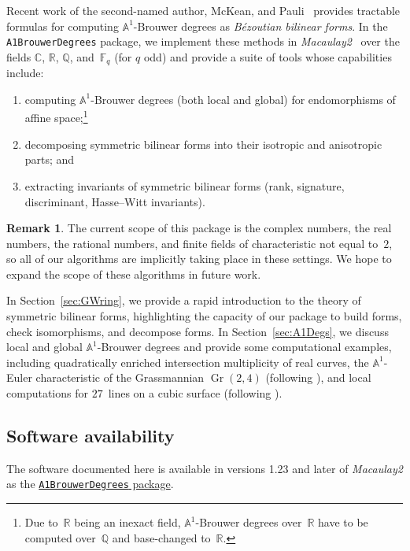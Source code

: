 \documentclass[12pt]{amsart}
\theoremstyle{definition}
\newtheorem{remark}[theorem]{Remark}
\providecommand{\A}{\mathbb{A}}
\DeclareMathOperator{\Gr}{Gr}
\begin{document}
Recent work of the second-named author, McKean, and Pauli~\cite{BMP} provides tractable formulas for computing $\A^1$-Brouwer degrees as \emph{B\'ezoutian bilinear forms}. In the \texttt{A1BrouwerDegrees} package, we implement these methods in \emph{Macaulay2}~\cite{M2} over the fields $\mathbb{C}$, $\mathbb{R}$, $\mathbb{Q}$, and~$\mathbb{F}_q$ (for $q$ odd) and provide a suite of tools whose capabilities include:
\begin{enumerate}
    \item computing $\A^1$-Brouwer degrees (both local and global) for endomorphisms of affine space;\footnote{Due to~$\mathbb{R}$ being an inexact field, $\mathbb{A}^{1}$-Brouwer degrees over~$\mathbb{R}$ have to be computed over~$\mathbb{Q}$ and base-changed to~$\mathbb{R}$.}
    \item decomposing symmetric bilinear forms into their isotropic and anisotropic parts; and
    \item extracting invariants of symmetric bilinear forms (rank, signature, discriminant, Hasse--Witt invariants).
\end{enumerate}

\begin{remark} 
The current scope of this package is the complex numbers, the real numbers, the rational numbers, and finite fields of characteristic not equal to~$2$, so all of our algorithms are implicitly taking place in these settings. We hope to expand the scope of these algorithms in future work.
\end{remark}

In Section~\ref{sec:GWring}, we provide a rapid introduction to the theory of symmetric bilinear forms, highlighting the capacity of our package to build forms, check isomorphisms, and decompose forms. In Section~\ref{sec:A1Degs}, we discuss local and global $\A^1$-Brouwer degrees and provide some computational examples, including quadratically enriched intersection multiplicity of real curves, the $\A^1$-Euler characteristic of the Grassmannian $\Gr(2,4)$ (following \cite[Section~8.2]{BMP}), and local computations for $27$~lines on a cubic surface (following \cite{CubicKW,Pauli}).

\subsection{Software availability}
The software documented here is available in versions 1.23 and later of \emph{Macaulay2} as the \href{https://macaulay2.com/doc/Macaulay2/share/doc/Macaulay2/A1BrouwerDegrees/html/index.html}{\texttt{A1BrouwerDegrees} package}.
\end{document}
